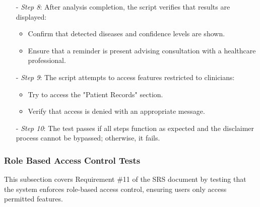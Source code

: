 \documentclass[12pt, titlepage]{article}
\begin{document}
\begin{enumerate}
\begin{itemize}
\begin{itemize}
    \end{itemize}
  \item[-] \textit{Step 8}: After analysis completion, the script verifies that results are displayed:
    \begin{itemize}
      \item Confirm that detected diseases and confidence levels are shown.
      \item Ensure that a reminder is present advising consultation with a healthcare professional.
    \end{itemize}
  \item[-] \textit{Step 9}: The script attempts to access features restricted to clinicians:
    \begin{itemize}
      \item Try to access the "Patient Records" section.
      \item Verify that access is denied with an appropriate message.
    \end{itemize}
  \item[-] \textit{Step 10}: The test passes if all steps function as expected and the disclaimer process cannot be bypassed; otherwise, it fails.
\end{itemize}

\end{enumerate}

\subsubsection{Role Based Access Control Tests}

This subsection covers Requirement \#11 of the SRS document by testing that the system enforces role-based access control, ensuring users only access permitted features.
\end{document}

